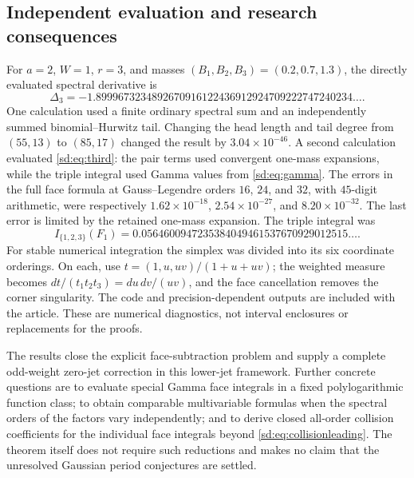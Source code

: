 \subsection{Independent evaluation and research consequences}
\label{sd:subsec:validation}

For $a=2$, $W=1$, $r=3$, and masses
$(B_1,B_2,B_3)=(0.2,0.7,1.3)$, the directly evaluated spectral derivative is
\begin{equation}\label{sd:eq:numeric}
 \Delta_3=-1.8999673234892670916122436912924709222747240234\ldots.
\end{equation}
One calculation used a finite ordinary spectral sum and an independently
summed binomial--Hurwitz tail.  Changing the head length and tail degree
from $(55,13)$ to $(85,17)$ changed the result by $3.04\times10^{-46}$.
A second calculation evaluated \eqref{sd:eq:third}: the pair terms used
convergent one-mass expansions, while the triple integral used Gamma
values from \eqref{sd:eq:gamma}.  The errors in the full face formula
at Gauss--Legendre orders $16$, $24$, and $32$, with $45$-digit
arithmetic, were respectively
$1.62\times10^{-18}$, $2.54\times10^{-27}$, and
$8.20\times10^{-32}$.  The last error is limited by the retained
one-mass expansion.  The triple integral was
\[
 I_{\{1,2,3\}}(F_1)
    =0.0564600947235384049461537670929012515\ldots.
\]
For stable numerical integration the simplex was divided into its six
coordinate orderings.  On each, use
$t=(1,u,uv)/(1+u+uv)$; the weighted measure becomes
$dt/(t_1t_2t_3)=du\,dv/(uv)$, and the face cancellation removes the
corner singularity.  The code and precision-dependent outputs are
included with the article.  These are numerical diagnostics, not
interval enclosures or replacements for the proofs.

The results close the explicit face-subtraction problem and supply a
complete odd-weight zero-jet correction in this lower-jet framework.
Further concrete questions are to evaluate special Gamma face integrals
in a fixed polylogarithmic function class; to obtain comparable
multivariable formulas when the spectral orders of the factors vary
independently; and to derive closed all-order collision coefficients for
the individual face integrals beyond \eqref{sd:eq:collisionleading}.
The theorem itself does not require such reductions and makes no claim
that the unresolved Gaussian period conjectures are settled.
